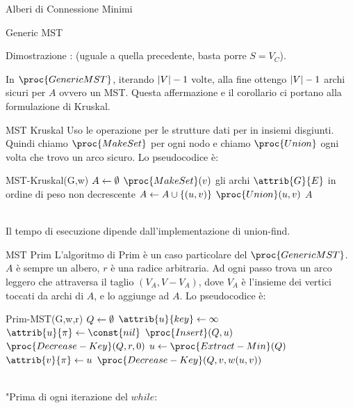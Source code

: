 \documentclass[8pt]{extarticle}
\begin{document}
\begin{formulario}
\begin{myParagraphEnd}{Alberi di Connessione Minimi}
\begin{subParagraph}{Generic MST}
\begin{Descr}
				\item[Dimostrazione]: (uguale a quella precedente, basta porre $S=V_C$).
			\end{Descr}
In $\proc{GenericMST}$, iterando $\left\vert V \right\vert-1$ volte, alla fine ottengo $\left\vert V \right\vert-1$ archi sicuri per $A$ ovvero un MST. Questa affermazione e il corollario ci portano alla formulazione di Kruskal.
		\end{subParagraph}
		\begin{subParagraph}{MST Kruskal}
Uso le operazione per le strutture dati per in insiemi disgiunti. Quindi chiamo $\proc{MakeSet}$ per ogni nodo e chiamo $\proc{Union}$ ogni volta che trovo un arco sicuro. Lo pseudocodice è:
			\begin{code}{MST-Kruskal(G,w)}
\li $A\leftarrow\emptyset$
\li {}
	\li $\proc{MakeSet}(v)$
\END
\li {} gli archi $\attrib{G}{E}$ in ordine di peso non decrescente
\li {}
	\li {}
		\li $A\leftarrow A\cup\{(u,v)\}$
		\li $\proc{Union}(u,v)$
	\END
\END
\li \RETURN $A$
			\end{code}
\\
Il tempo di esecuzione dipende dall'implementazione di union-find.
		\end{subParagraph}
		\begin{subParagraph}{MST Prim}
L'algoritmo di Prim è un caso particolare del $\proc{GenericMST}$. $A$ è sempre un albero, $r$ è una radice arbitraria. Ad ogni passo trova un arco leggero che attraversa il taglio $(V_A, V-V_A)$, dove $V_A$ è l'insieme dei vertici toccati da archi di $A$, e lo aggiunge ad $A$. Lo pseudocodice è:
			\begin{code}{Prim-MST(G,w,r)}
\li $Q\leftarrow\emptyset$ 
\li {}
	\li $\attrib{u}{key}\get \infty$
	\li $\attrib{u}{\pi}\get\const{nil}$
	\li $\proc{Insert}(Q,u)$
\END
\li $\proc{Decrease-Key}(Q,r,0)$ 
\li {}
	\li $u\get\proc{Extract-Min}(Q)$
	\li {}
		\li {}
			\li $\attrib{v}{\pi}\get u$
			\li $\proc{Decrease-Key}(Q,v,w(u,v))$
		\END
	\END
\END
			\end{code}
\\
"Prima di ogni iterazione del $while$:

\end{subParagraph}
\end{myParagraphEnd}
\end{formulario}
\end{document}
